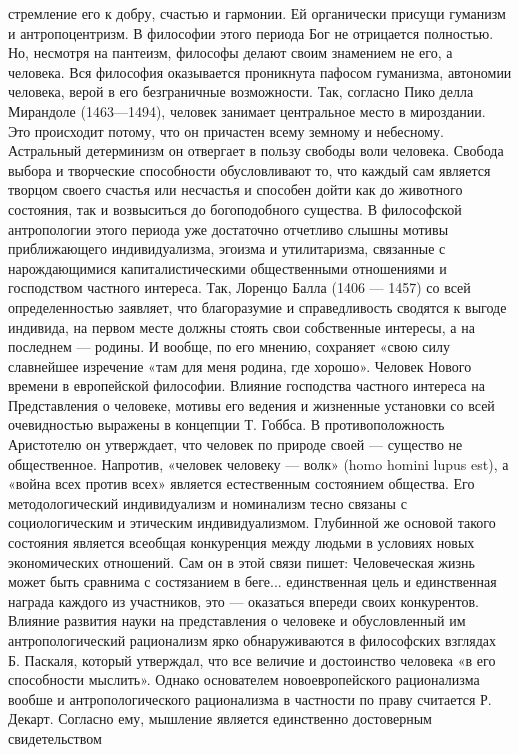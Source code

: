 \documentclass[12pt]{article}
\begin{document}
стремление его к добру, счастью и гармонии. Ей органически присущи гуманизм и антропоцентризм. В
философии этого периода Бог не отрицается полностью. Но, несмотря на пантеизм, философы делают своим
знамением не его, а человека. Вся философия оказывается проникнута пафосом гуманизма, автономии
человека, верой в его безграничные возможности.
Так, согласно Пико делла Мирандоле (1463—1494), человек занимает центральное место в мироздании. Это
происходит потому, что он причастен всему земному и небесному. Астральный детерминизм он отвергает в
пользу свободы воли человека. Свобода выбора и творческие способности обусловливают то, что каждый сам
является творцом своего счастья или несчастья и способен дойти как до животного состояния, так и
возвыситься до богоподобного существа.
В философской антропологии этого периода уже достаточно отчетливо слышны мотивы приближающего
индивидуализма, эгоизма и утилитаризма, связанные с нарождающимися капиталистическими общественными
отношениями и господством частного интереса. Так, Лоренцо Балла (1406 — 1457) со всей определенностью
заявляет, что благоразумие и справедливость сводятся к выгоде индивида, на первом месте должны стоять свои
собственные интересы, а на последнем — родины. И вообще, по его мнению, сохраняет «свою силу славнейшее
изречение «там для меня родина, где хорошо».
Человек Нового времени в европейской философии.
Влияние господства частного интереса на Представления о человеке, мотивы его ведения и жизненные
установки со всей очевидностью выражены в концепции Т. Гоббса. В противоположность Аристотелю он
утверждает, что человек по природе своей — существо не общественное. Напротив, «человек человеку — волк»
(homo homini lupus est), а «война всех против всех» является естественным состоянием общества. Его
методологический индивидуализм и номинализм тесно связаны с социологическим и этическим
индивидуализмом. Глубинной же основой такого состояния является всеобщая конкуренция между людьми в
условиях новых экономических отношений. Сам он в этой связи пишет:
Человеческая жизнь может быть сравнима с состязанием в беге... единственная цель и единственная награда
каждого из участников, это — оказаться впереди своих конкурентов.
Влияние развития науки на представления о человеке и обусловленный им антропологический рационализм
ярко обнаруживаются в философских взглядах Б. Паскаля, который утверждал, что все величие и достоинство
человека «в его способности мыслить».
Однако основателем новоевропейского рационализма вообше и антропологического рационализма в частности 
по праву считается Р. Декарт. Согласно ему, мышление является единственно достоверным свидетельством
\end{document}
